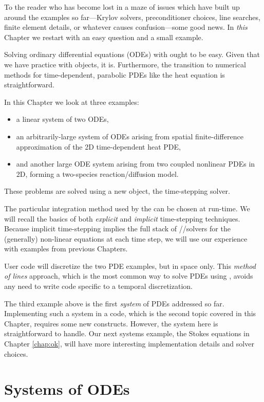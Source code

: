 
To the reader who has become lost in a maze of issues which have built up around the examples so far---Krylov solvers, preconditioner choices, line searches, finite element details, or whatever causes confusion---some good news.  In \emph{this} Chapter we restart with an easy question and a small example.

Solving ordinary differential equations (ODEs) with \PETSc ought to be easy.  Given that we have practice with \PETSc objects, it is.  Furthermore, the transition to numerical methods for time-dependent, parabolic PDEs like the heat equation is straightforward.

In this Chapter we look at three examples:
\begin{itemize}
\item a linear system of two ODEs,
\item an arbitrarily-large system of ODEs arising from spatial finite-difference approximation of the 2D time-dependent heat PDE,
\item and another large ODE system arising from two coupled nonlinear PDEs in 2D, forming a two-species reaction/diffusion model.
\end{itemize}
These problems are solved using a new \PETSc object, the \pTS time-stepping solver.

The particular integration method used by the \pTS can be chosen at run-time.  We will recall the basics of both \emph{explicit} and \emph{implicit} time-stepping techniques.  Because implicit time-stepping implies the full stack of \pSNES/\pKSP/\pPC solvers for the (generally) non-linear equations at each time step, we will use our experience with examples from previous Chapters.

User code will discretize the two PDE examples, but in space only.  This \emph{method of lines} approach, which is the most common way to solve PDEs using \PETSc \pTS, avoids any need to write code specific to a temporal discretization.

The third example above is the first \emph{system} of PDEs addressed so far.  Implementing such a system in a \PETSc code, which is the second topic covered in this Chapter, requires some new constructs.  However, the system here is straightforward to handle.  Our next systems example, the Stokes equations in Chapter \ref{chap:ok}, will have more interesting implementation details and solver choices.


\section{Systems of ODEs}

